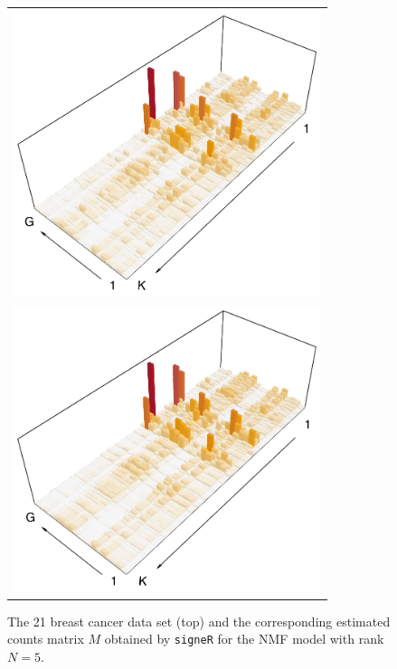 \documentclass[11pt]{amsart}
\theoremstyle{definition}
\begin{document}
\begin{center}
\begin{figure}
 \begin{tabular}{c}
 \includegraphics[width=9cm]{sfigs/21_Breast_Cancer_3D_M}
 \\
 \includegraphics[width=9cm]{sfigs/21_Breast_Cancer_3D_Mhat}
 \end{tabular}
 \caption{The 21 breast cancer data set (top) and the corresponding
   estimated counts matrix $M$ obtained by \texttt{signeR} for the NMF
   model with rank $N=5$.
 }\label{fig:bcancerDATA}
\end{figure}
\end{center}
\end{document}
